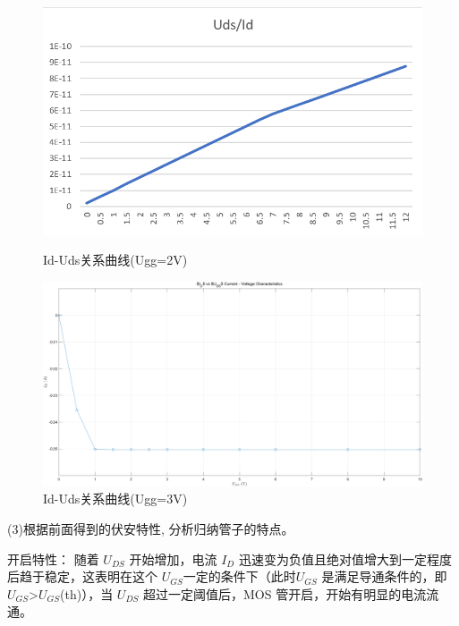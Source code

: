 \documentclass[10pt, a4paper]{article} %
\begin{document}
\begin{figure}[ht]
    \centering
    \begin{minipage}[ht]{0.48\linewidth}
        \centering
        \includegraphics[width=\linewidth]{image/6.png}
        \caption{Id-Uds关系曲线(Ugg=2V)}
        \label{fig:Id-Uds1}
    \end{minipage}
    \hfill
    \begin{minipage}[ht]{0.48\linewidth}
        \centering
        \includegraphics[width=\linewidth]{image/7.png}
        \caption{Id-Uds关系曲线(Ugg=3V)}
        \label{fig:Id-Uds2} 
    \end{minipage}
    
\end{figure}

\newpage

(3)根据前面得到的伏安特性, 分析归纳管子的特点。

开启特性：
随着 $U_{DS}$ 开始增加，电流 $I_{D}$ 迅速变为负值且绝对值增大到一定程度后趋于稳定，这表明在这个 $U_{GS}$一定的条件下（此时$U_{GS}$ 是满足导通条件的，即$U_{GS}$>$U_{GS}$(th)），当 $U_{DS}$ 超过一定阈值后，MOS 管开启，开始有明显的电流流通。
\end{document}
